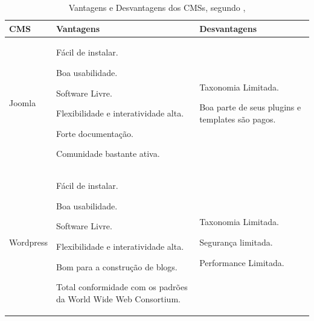  	\begin{center}
 	
 	
 	\begin{longtable}{|p{65pt}|p{140pt}|p{140pt}|}
	
	\caption{Vantagens e Desvantagens dos CMSs, segundo \cite{costa}, \cite{Reis}}
	
 	 \label{Vantagens}\\

 	\hline
 	 {\raggedright \textbf{CMS}}
 	 & {\raggedright \textbf{Vantagens}}
 	 & {\raggedright \textbf{Desvantagens}}\\
 	\hline
 	 {\raggedright Joomla}
 	 & {\raggedright 
 	                  Fácil de instalar.
 	                   
 	                  Boa usabilidade.		
			   
			  Software Livre.		
			   
			  Flexibilidade e interatividade alta.
			  
			  Forte documentação.
			  
			  Comunidade bastante ativa.
			  
			  
%  	             
	    }
 	 & {\raggedright 
 	                Taxonomia Limitada.
 	                
 	                Boa parte de seus plugins e templates são pagos.
 	
 	
 	}\\
 	\hline
 	 {\raggedright Wordpress}
 	 & {\raggedright %
 	                  Fácil de instalar.
 	                  
 	                  Boa usabilidade.		
			  
			  Software Livre.		
			  
			  Flexibilidade e interatividade alta.
			  
			  Bom para a construção de blogs.
			  
			  Total conformidade com os padrões da World Wide Web Consortium. 
 	                 
 	                 
 	                 }
 	 & {\raggedright %
 	               Taxonomia Limitada.
 	               
 	               Segurança limitada.
 	               
 	               Performance Limitada.
 	               
}
\end{longtable}
\end{center}
